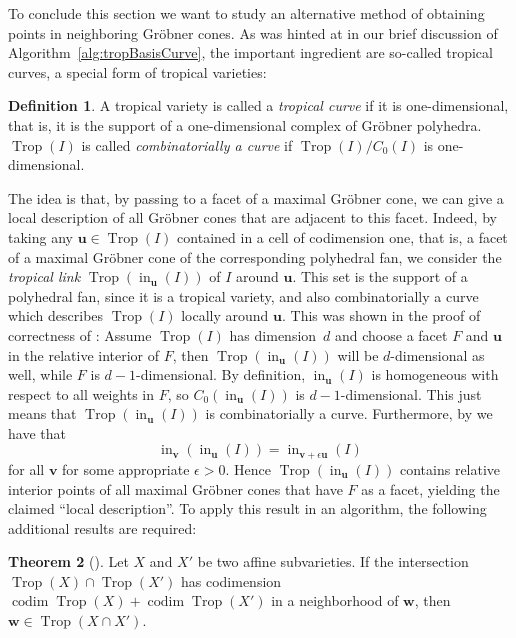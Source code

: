 \documentclass[
  paper=a4,
  titlepage,
  bibliography=totoc,
  pagesize=pdftex
]{scrartcl}
\numberwithin{figure}{section}
\numberwithin{equation}{section}
\numberwithin{table}{section}
\let\vec\mathbf
\DeclareMathOperator{\Trop}{Trop}
\DeclareMathOperator{\initial}{in}
\DeclareMathOperator{\codim}{codim}
\theoremstyle{definition}
\newtheorem{definition}{Definition}
\newtheorem{theorem}[definition]{Theorem}
\numberwithin{definition}{section}
\begin{document}
To conclude this section we want to study an alternative method of obtaining points in
neighboring Gröbner cones. As was hinted at in our brief discussion of
Algorithm~\ref{alg:tropBasisCurve}, the important ingredient are so-called tropical
curves, a special form of tropical varieties:

\begin{definition}
  A tropical variety is called a \emph{tropical curve} if it is one-dimensional, that is,
  it is the support of a one-dimensional complex of Gröbner polyhedra. $\Trop(I)$ is
  called \emph{combinatorially a curve} if $\Trop(I)/C_0(I)$ is one-dimensional.
\end{definition}

The idea is that, by passing to a facet of a maximal Gröbner cone, we can give a local
description of all Gröbner cones that are adjacent to this facet. Indeed, by taking any
$\vec u \in \Trop(I)$ contained in a cell of codimension one, that is, a facet of a
maximal Gröbner cone of the corresponding polyhedral fan, we consider the \emph{tropical
link} $\Trop(\initial_{\vec u}(I))$ of $I$ around $\vec u$. This set is the support of a
polyhedral fan, since it is a tropical variety, and also combinatorially a curve which
describes $\Trop(I)$ locally around $\vec u$. This was shown in the proof of correctness
of \cite[Algorithm~4.10]{compTropVar}: Assume $\Trop(I)$ has dimension~$d$ and choose a
facet $F$ and $\vec u$ in the relative interior of $F$, then $\Trop(\initial_{\vec u}(I))$
will be $d$-dimensional as well, while $F$ is $d-1$-dimensional. By definition,
$\initial_{\vec u}(I)$ is homogeneous with respect to all weights in $F$, so
$C_0(\initial_{\vec u}(I))$ is $d-1$-dimensional. This just means that
$\Trop(\initial_{\vec u}(I))$ is combinatorially a curve. Furthermore, by
\cite[Proposition~1.13]{SturmGBCP} we have that
\[
  \initial_{\vec v}(\initial_{\vec u}(I)) = \initial_{\vec v + \epsilon \vec u}(I)
\]
for all $\vec v$ for some appropriate $\epsilon>0$. Hence $\Trop(\initial_{\vec u}(I))$
contains relative interior points of all maximal Gröbner cones that have $F$ as a facet,
yielding the claimed \enquote{local description}. To apply this result in an algorithm,
the following additional results are required:

\begin{theorem}[{\cite[Theorem~1.1]{ossTropLift}}]
  \label{thm:tropInt}
  Let $X$ and $X'$ be two affine subvarieties. If the intersection $\Trop(X) \cap
  \Trop(X')$ has codimension $\codim\Trop(X) + \codim\Trop(X')$ in a neighborhood of $\vec
  w$, then $\vec w \in \Trop(X\cap X')$.
\end{theorem}
\end{document}
